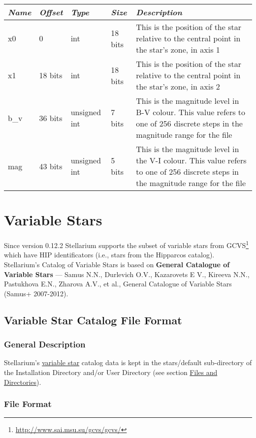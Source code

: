 \begin{longtabu} to \textwidth {l l l l X}
\toprule
\emph{Name} & \emph{Offset} & \emph{Type} & \emph{Size} &
\emph{Description}\tabularnewline
\midrule
x0 & 0 & int & 18 bits & This is the position of the star relative to
the central point in the star's zone, in axis 1\tabularnewline
\midrule
x1 & 18 bits & int & 18 bits & This is the position of the star relative
to the central point in the star's zone, in axis 2\tabularnewline
\midrule
b\_v & 36 bits & unsigned int & 7 bits & This is the magnitude level in
B-V colour. This value refers to one of 256 discrete steps in the
magnitude range for the file\tabularnewline
\midrule
mag & 43 bits & unsigned int & 5 bits & This is the magnitude level in
the V-I colour. This value refers to one of 256 discrete steps in the
magnitude range for the file\tabularnewline
\bottomrule
\end{longtabu}


\section{Variable Stars}
\label{ch:StarCatalogues:VariableStars}

Since version 0.12.2 Stellarium supports the subset of variable stars
from GCVS\footnote{\url{http://www.sai.msu.su/gcvs/gcvs/}} which have  HIP
identificators (i.e., stars from the Hipparcos catalog). Stellarium's Catalog
of Variable Stars is based on 
\textbf{General Catalogue of Variable Stars} --- Samus N.N., Durlevich
O.V., Kazarovets E V., Kireeva N.N., Pastukhova E.N., Zharova A.V., et
al., General Catalogue of Variable Stars (Samus+ 2007-2012).

\subsection{Variable Star Catalog File Format}
\label{ch:StarCatalogues:VariableStars:format}

\subsubsection{General Description}\label{general-description}

Stellarium's \href{Variable_Stars}{variable star} catalog data is kept
in the stars/default sub-directory of the Installation Directory and/or
User Directory (see section
\href{Advanced_Use\#Files_and_Directories}{Files and Directories}).

\subsubsection{File Format}\label{file-format}

